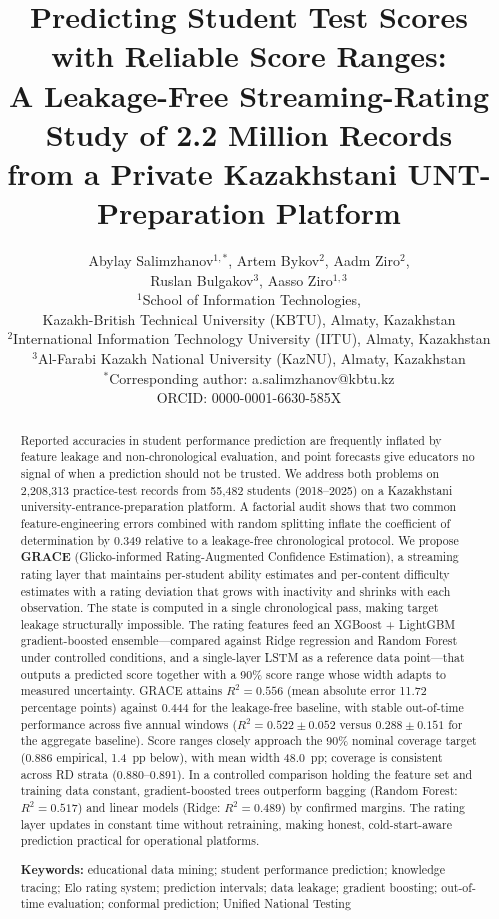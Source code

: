 \documentclass[11pt]{article}
\title{Predicting Student Test Scores with Reliable Score Ranges:\\
A Leakage-Free Streaming-Rating Study of 2.2 Million Records\\
from a Private Kazakhstani UNT-Preparation Platform}
\author{Abylay Salimzhanov$^{1,*}$, Artem Bykov$^{2}$, Aadm Ziro$^{2}$,\\[2pt]
Ruslan Bulgakov$^{3}$, Aasso Ziro$^{1,3}$\\[4pt]
$^{1}$School of Information Technologies,\\
Kazakh-British Technical University (KBTU), Almaty, Kazakhstan\\
$^{2}$International Information Technology University (IITU), Almaty, Kazakhstan\\
$^{3}$Al-Farabi Kazakh National University (KazNU), Almaty, Kazakhstan\\[4pt]
$^{*}$Corresponding author: a.salimzhanov@kbtu.kz\\
ORCID: 0000-0001-6630-585X}
\date{}
\begin{document}
\maketitle

\begin{abstract}
Reported accuracies in student performance prediction are frequently inflated by feature
leakage and non-chronological evaluation, and point forecasts give educators no signal of
when a prediction should not be trusted.
We address both problems on 2,208,313 practice-test records from 55,482 students
(2018--2025) on a Kazakhstani university-entrance-preparation platform.
A factorial audit shows that two common feature-engineering errors combined with random
splitting inflate the coefficient of determination by 0.349 relative to a leakage-free
chronological protocol.
We propose \textbf{GRACE} (Glicko-informed Rating-Augmented Confidence Estimation),
a streaming rating layer that maintains per-student ability estimates and per-content
difficulty estimates with a rating deviation that grows with inactivity and shrinks with
each observation.
The state is computed in a single chronological pass, making target leakage structurally
impossible.
The rating features feed an XGBoost + LightGBM gradient-boosted ensemble---compared
against Ridge regression and Random Forest under controlled conditions, and a single-layer
LSTM as a reference data point---that outputs a predicted score together with a 90\% score
range whose width adapts to measured uncertainty.
GRACE attains $R^{2} = 0.556$ (mean absolute error 11.72 percentage points) against
0.444 for the leakage-free baseline, with stable out-of-time performance across five
annual windows ($R^{2} = 0.522 \pm 0.052$ versus $0.288 \pm 0.151$ for the aggregate baseline).
Score ranges closely approach the 90\% nominal coverage target (0.886 empirical, 1.4~pp below),
with mean width 48.0~pp; coverage is consistent across RD strata (0.880--0.891).
In a controlled comparison holding the feature set and training data constant,
gradient-boosted trees outperform bagging (Random Forest: $R^{2}=0.517$) and
linear models (Ridge: $R^{2}=0.489$) by confirmed margins.
The rating layer updates in constant time without retraining, making honest,
cold-start-aware prediction practical for operational platforms.

\medskip\noindent
\textbf{Keywords:} educational data mining; student performance prediction;
knowledge tracing; Elo rating system; prediction intervals; data leakage;
gradient boosting; out-of-time evaluation; conformal prediction;
Unified National Testing
\end{abstract}
\end{document}
